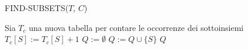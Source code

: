\begin{algorithm}[H]
    \caption{FIND-SUBSETS($T$, $C$)}\label{alg:find-subsets}
    \begin{algorithmic}[1]
        \State Sia $T_c$ una nuova tabella per contare le occorrenze dei sottoinsiemi
                \State $T_c[S] := T_c[S] + 1$
            \EndFor
        \EndFor
        \State $Q := \emptyset$
                \State $Q := Q \cup \{S\}$
            \EndIf
        \EndFor
        \State \Return $Q$
    \end{algorithmic}
\end{algorithm}